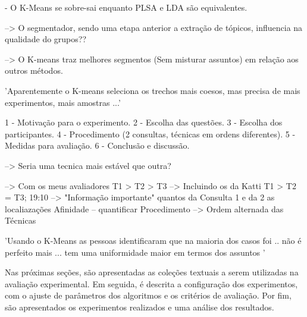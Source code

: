 
 - O K-Means se sobre-sai enquanto PLSA e LDA são equivalentes.

--> O segmentador, sendo uma etapa anterior a extração de tópicos, influencia na qualidade do grupos??

--> O K-means traz melhores segmentos (Sem misturar assuntos) em relação aos outros métodos.

'Aparentemente o K-means seleciona os trechos mais coesos, mas precisa de mais experimentos, mais amostras ...'


 1 - Motivação para o experimento.
 2 - Escolha das questões.
 3 - Escolha dos participantes.
 4 - Procedimento (2 consultas, técnicas em ordens diferentes).
 5 - Medidas para avaliação.
 6 - Conclusão e discussão.



--> Seria uma tecnica mais estável que outra? 


--> Com os meus avaliadores T1 > T2 > T3
--> Incluindo os da Katti   T1 > T2 = T3;
19:10 --> "Informação importante"
quantos da Consulta 1 e da 2
as localiazações
Afinidade -- quantificar
Procedimento --> Ordem alternada das Técnicas






'Usando o K-Means as pessoas identificaram que na maioria dos casos foi .. não é perfeito mais ... tem uma uniformidade maior em termos dos assuntos '





Nas próximas seções, são apresentadas as coleções textuais a serem utilizadas na avaliação experimental. Em seguida, é descrita a configuração dos experimentos, com o ajuste de parâmetros dos algoritmos e os critérios de avaliação. Por fim, são apresentados os experimentos realizados e uma análise dos resultados.


